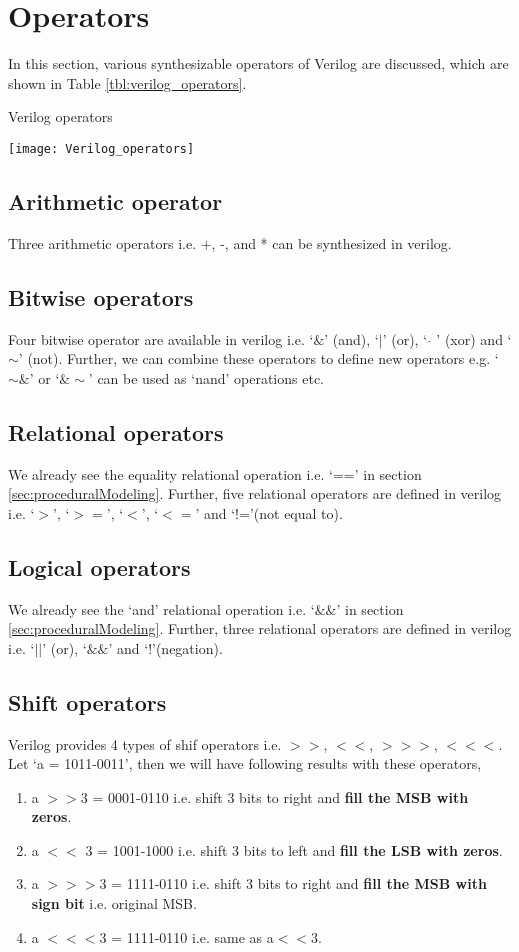 \section{Operators}\label{sec:opearators}
In this section, various synthesizable operators of Verilog are discussed, which are shown in Table \ref{tbl:verilog_operators}. 

\begin{table}[!h]
	\centering
	\caption{Verilog operators}
	\texttt{[image: Verilog\_operators]}
	\label{tbl:verilog_operators}
\end{table}

\subsection{Arithmetic operator}
Three arithmetic operators i.e. +, -, and * can be synthesized in verilog.

\subsection{Bitwise operators}
Four bitwise operator are available in verilog i.e. `$\&$' (and), `$|$' (or), ` $\hat{}$ ' (xor) and `$\sim$' (not). Further, we can combine these operators to define new operators e.g. `$\sim\&$' or `$\&\sim$' can be used as `nand' operations etc. 

\subsection{Relational operators}
We already see the equality relational operation i.e. `==' in section \ref{sec:proceduralModeling}. Further, five relational operators are defined in verilog i.e. `$>$', `$>=$', `$<$', `$<=$' and `$!$='(not equal to). 

\subsection{Logical operators}
We already see the `and' relational operation i.e. `$\&\&$' in section \ref{sec:proceduralModeling}. Further, three relational operators are defined in verilog i.e. `$||$' (or), `$\&\&$' and `$!$'(negation).

\subsection{Shift operators}
Verilog provides 4 types of shif operators i.e. $>>$, $<<$, $>>>$, $<<<$. Let `a = 1011-0011', then we will have following results with these operators, 
\begin{enumerate}
	\item a $>>$3 = 0001-0110 i.e. shift 3 bits to right and \textbf{fill the MSB with zeros}. 
	\item a $<<$ 3 = 1001-1000 i.e. shift 3 bits to left and \textbf{fill the LSB with zeros}. 
	\item a $>>>$3 = 1111-0110 i.e. shift 3 bits to right and \textbf{fill the MSB with sign bit} i.e. original MSB. 
	\item a $<<<$3 = 1111-0110 i.e. same as a$<<3$.
\end{enumerate}
